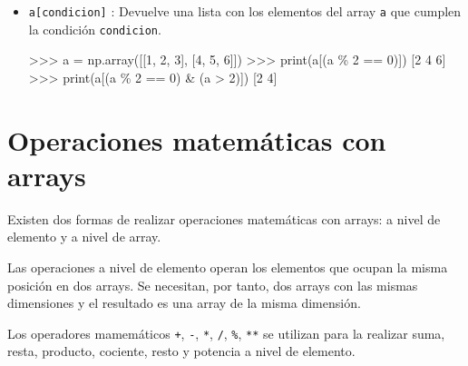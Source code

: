\documentclass[
  spanish,
  a4paper,
]{scrreport}
\newenvironment{Shaded}{\begin{snugshade}}{\end{snugshade}}
\newcommand{\BuiltInTok}[1]{\textcolor[rgb]{0.00,0.23,0.31}{#1}}
\newcommand{\DecValTok}[1]{\textcolor[rgb]{0.68,0.00,0.00}{#1}}
\newcommand{\NormalTok}[1]{\textcolor[rgb]{0.00,0.23,0.31}{#1}}
\newcommand{\OperatorTok}[1]{\textcolor[rgb]{0.37,0.37,0.37}{#1}}
\begin{document}
\begin{itemize}
\item
  \texttt{a{[}condicion{]}} : Devuelve una lista con los elementos del
  array \texttt{a} que cumplen la condición \texttt{condicion}.

\begin{Shaded}
\begin{Highlighting}[]
\OperatorTok{\textgreater{}\textgreater{}\textgreater{}}\NormalTok{ a }\OperatorTok{=}\NormalTok{ np.array([[}\DecValTok{1}\NormalTok{, }\DecValTok{2}\NormalTok{, }\DecValTok{3}\NormalTok{], [}\DecValTok{4}\NormalTok{, }\DecValTok{5}\NormalTok{, }\DecValTok{6}\NormalTok{]])}
\OperatorTok{\textgreater{}\textgreater{}\textgreater{}} \BuiltInTok{print}\NormalTok{(a[(a }\OperatorTok{\%} \DecValTok{2} \OperatorTok{==} \DecValTok{0}\NormalTok{)])}
\NormalTok{[}\DecValTok{2} \DecValTok{4} \DecValTok{6}\NormalTok{]}
\OperatorTok{\textgreater{}\textgreater{}\textgreater{}} \BuiltInTok{print}\NormalTok{(a[(a }\OperatorTok{\%} \DecValTok{2} \OperatorTok{==} \DecValTok{0}\NormalTok{) }\OperatorTok{\&}\NormalTok{  (a }\OperatorTok{\textgreater{}} \DecValTok{2}\NormalTok{)])}
\NormalTok{[}\DecValTok{2} \DecValTok{4}\NormalTok{]}
\end{Highlighting}
\end{Shaded}
\end{itemize}

\section{Operaciones matemáticas con
arrays}\label{operaciones-matemuxe1ticas-con-arrays}

Existen dos formas de realizar operaciones matemáticas con arrays: a
nivel de elemento y a nivel de array.

Las operaciones a nivel de elemento operan los elementos que ocupan la
misma posición en dos arrays. Se necesitan, por tanto, dos arrays con
las mismas dimensiones y el resultado es una array de la misma
dimensión.

Los operadores mamemáticos \texttt{+}, \texttt{-}, \texttt{*},
\texttt{/}, \texttt{\%}, \texttt{**} se utilizan para la realizar suma,
resta, producto, cociente, resto y potencia a nivel de elemento.
\end{document}
